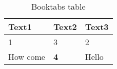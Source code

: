 
\begin{table}[H]
\centering
\caption{Booktabs table}
\label{tbl:table1}
\begin{tabular}{@{}lll@{}}
\toprule
Text1    & Text2      & Text3 \\ \midrule
1        & 3          & 2     \\
How come & \textbf{4} & Hello \\ \bottomrule
\end{tabular}
\end{table}
